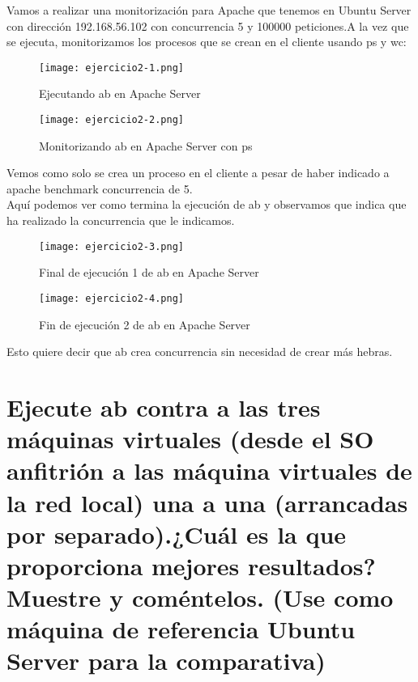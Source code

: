 	Vamos a realizar una monitorización para Apache que tenemos en Ubuntu Server con dirección 192.168.56.102 con concurrencia 5 y 100000 peticiones.A la vez que se ejecuta, monitorizamos los procesos que se crean en el cliente usando  ps\cite{ejercicio2-2} y wc\cite{ejercicio2-3}:
	
	
	\begin{figure}[H] 
	 	\centering
	 	\texttt{[image: ejercicio2-1.png]} 
	 	\label{figura9} 
	 	\caption{Ejecutando ab en Apache Server}
	\end{figure}
	
	\begin{figure}[H] 
		\centering
		\texttt{[image: ejercicio2-2.png]} 
		\label{figura10} 
		\caption{Monitorizando ab en Apache Server con ps}
	\end{figure}
	
	Vemos como solo se crea un proceso en el cliente a pesar de haber indicado a apache benchmark concurrencia de 5.\\
	Aquí podemos ver como termina la ejecución de ab y observamos que indica que ha realizado la concurrencia que le indicamos.
	
	\begin{figure}[H] 
		\centering
		\texttt{[image: ejercicio2-3.png]} 
		\label{figura11} 
		\caption{Final de ejecución 1 de ab en Apache Server}
	\end{figure}
	
	\begin{figure}[H] 
		\centering
		\texttt{[image: ejercicio2-4.png]} 
		\label{figura12} 
		\caption{Fin de ejecución 2 de ab en Apache Server}
	\end{figure}
	
	Esto quiere decir que ab crea concurrencia sin necesidad de crear más hebras.
	
	\section{Ejecute ab contra a las tres máquinas virtuales (desde el SO anfitrión a las máquina virtuales de la red local) una a una (arrancadas por separado).¿Cuál es la que proporciona mejores resultados? Muestre y coméntelos. (Use como máquina de referencia Ubuntu Server para la comparativa)}
	
